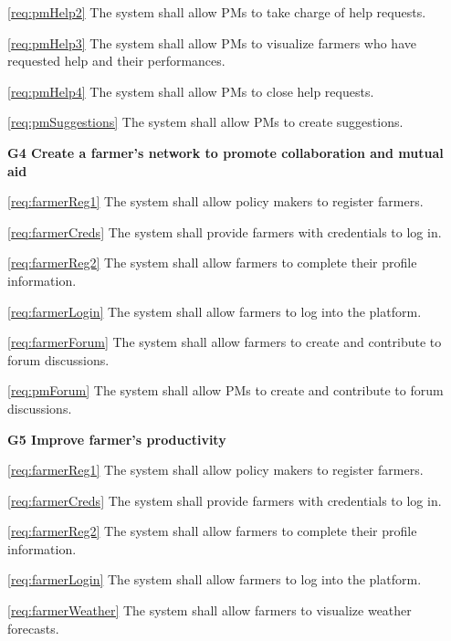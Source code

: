 \documentclass[10pt]{article}
\begin{document}
\begin{description}
\begin{description}
            \item \ref{req:pmHelp2} The system shall allow PMs to take charge of help requests.
            \item \ref{req:pmHelp3} The system shall allow PMs to visualize farmers who have requested help and their performances.
            \item \ref{req:pmHelp4} The system shall allow PMs to close help requests.
            \item \ref{req:pmSuggestions} The system shall allow PMs to create suggestions.
        \end{description}
    \item \textbf{G4 Create a farmer's network to promote collaboration and mutual aid}
        \begin{description}
            \item \ref{req:farmerReg1} The system shall allow policy makers to register farmers.    
            \item \ref{req:farmerCreds} The system shall provide farmers with credentials to log in.    
            \item \ref{req:farmerReg2} The system shall allow farmers to complete their profile information.    
            \item \ref{req:farmerLogin} The system shall allow farmers to log into the platform.
            \item \ref{req:farmerForum} The system shall allow farmers to create and contribute to forum discussions.
            \item \ref{req:pmForum} The system shall allow PMs to create and contribute to forum discussions.
        \end{description}
        \item \textbf{G5 Improve farmer's productivity}
        \begin{description}
            \item \ref{req:farmerReg1} The system shall allow policy makers to register farmers.    
            \item \ref{req:farmerCreds} The system shall provide farmers with credentials to log in.    
            \item \ref{req:farmerReg2} The system shall allow farmers to complete their profile information.    
            \item \ref{req:farmerLogin} The system shall allow farmers to log into the platform.
            \item \ref{req:farmerWeather} The system shall allow farmers to visualize weather forecasts.

\end{description}
\end{description}
\end{document}
